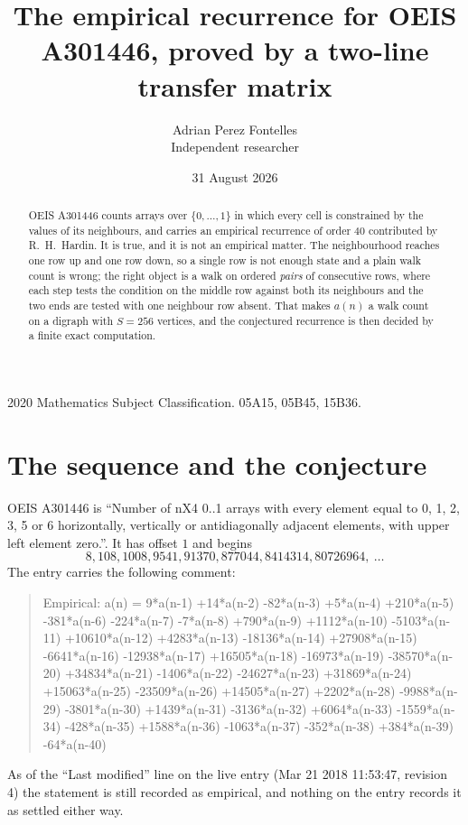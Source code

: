 \documentclass[11pt,a4paper]{article}
\title{The empirical recurrence for OEIS A301446, proved by a two-line transfer matrix}
\author{Adrian Perez Fontelles\\ \small Independent researcher}
\date{31 August 2026}
\theoremstyle{plain}
\theoremstyle{definition}
\begin{document}
\maketitle

\begin{abstract}
OEIS A301446 counts arrays over $\{0,\dots,1\}$ in which every cell is constrained by the
values of its neighbours, and carries an empirical recurrence of order $40$ contributed
by R.~H.~Hardin. It is true, and it is not an empirical matter. The neighbourhood reaches one
row up and one row down, so a single row is not enough state and a plain walk count
is wrong; the right object is a walk on ordered \emph{pairs} of consecutive rows, where
each step tests the condition on the middle row against both its neighbours and the two
ends are tested with one neighbour row absent. That makes $a(n)$ a walk count on a digraph
with $S=256$ vertices, and the conjectured recurrence is then decided by a finite exact
computation.
\end{abstract}

\noindent\small 2020 Mathematics Subject Classification. 05A15, 05B45, 15B36.\normalsize

\section{The sequence and the conjecture}

OEIS A301446 is ``Number of nX4 0..1 arrays with every element equal to 0, 1, 2, 3, 5 or 6 horizontally, vertically or antidiagonally adjacent elements, with upper left element zero.''. It has offset $1$ and begins
\[
8, 108, 1008, 9541, 91370, 877044, 8414314, 80726964,\ \dots
\]
The entry carries the following comment:
\begin{quote}\small
Empirical: a(n) = 9*a(n-1) +14*a(n-2) -82*a(n-3) +5*a(n-4) +210*a(n-5) -381*a(n-6) -224*a(n-7) -7*a(n-8) +790*a(n-9) +1112*a(n-10) -5103*a(n-11) +10610*a(n-12) +4283*a(n-13) -18136*a(n-14) +27908*a(n-15) -6641*a(n-16) -12938*a(n-17) +16505*a(n-18) -16973*a(n-19) -38570*a(n-20) +34834*a(n-21) -1406*a(n-22) -24627*a(n-23) +31869*a(n-24) +15063*a(n-25) -23509*a(n-26) +14505*a(n-27) +2202*a(n-28) -9988*a(n-29) -3801*a(n-30) +1439*a(n-31) -3136*a(n-32) +6064*a(n-33) -1559*a(n-34) -428*a(n-35) +1588*a(n-36) -1063*a(n-37) -352*a(n-38) +384*a(n-39) -64*a(n-40)
\end{quote}
As of the ``Last modified'' line on the live entry (Mar 21 2018 11:53:47, revision 4) the statement is
still recorded as empirical, and nothing on the entry records it as settled either way.
\end{document}
